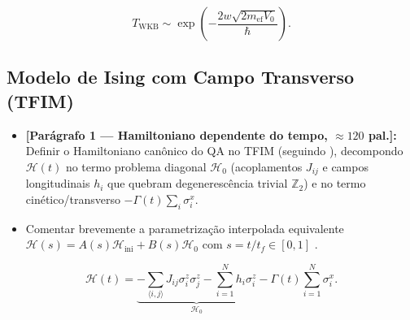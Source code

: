 \documentclass[aps,pre,twocolumn,10pt,superscriptaddress,nofootinbib]{revtex4-2}
\begin{document}
\begin{equation}
  T_{\text{WKB}} \sim \exp\!\left( -\frac{2 w \sqrt{2 m_{\text{ef}} V_0}}{\hbar} \right).
  \label{eq:wkb}
\end{equation}

\subsection{Modelo de Ising com Campo Transverso (TFIM)}
\label{subsec:tfim}

\begin{itemize}
  \item \textbf{[Parágrafo 1 --- Hamiltoniano dependente do tempo, $\approx 120$ pal.]:}
        Definir o Hamiltoniano canônico do QA no TFIM (seguindo \cite{Kadowaki1998,Das2008}), decompondo $\mathcal{H}(t)$ no termo problema diagonal $\mathcal{H}_0$ (acoplamentos $J_{ij}$ e campos longitudinais $h_i$ que quebram degenerescência trivial $\mathbb{Z}_2$) e no termo cinético/transverso $-\Gamma(t)\sum_i \sigma_i^x$.
  \item Comentar brevemente a parametrização interpolada equivalente $\mathcal{H}(s) = A(s)\mathcal{H}_{\text{ini}} + B(s)\mathcal{H}_0$ com $s = t/t_f \in [0,1]$ \cite{Albash2018}.
\end{itemize}

\begin{equation}
  \mathcal{H}(t) = \underbrace{-\sum_{\langle i,j \rangle} J_{ij} \sigma_i^z \sigma_j^z - \sum_{i=1}^{N} h_i \sigma_i^z}_{\mathcal{H}_0} - \Gamma(t) \sum_{i=1}^{N} \sigma_i^x.
  \label{eq:tfim}
\end{equation}
\end{document}
